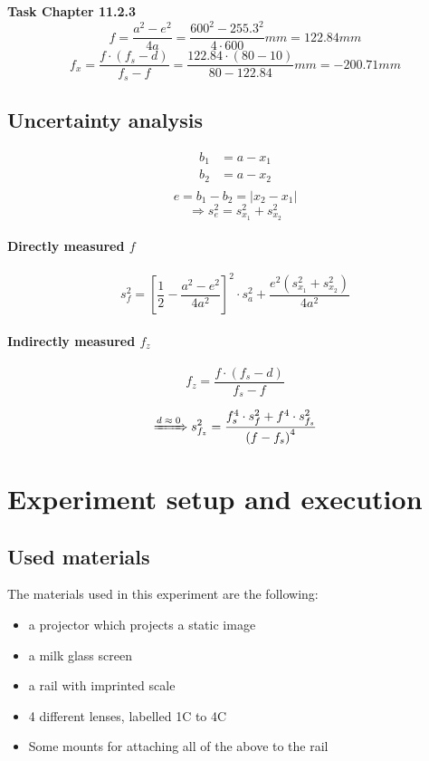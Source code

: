 \documentclass{scrreprt}
\begin{document}
\textbf{Task Chapter 11.2.3}
\begin{equation}
f = \frac{a^2-e^2}{4a} = \frac{600^2-255.3^2}{4\cdot 600}mm = 122.84mm
\end{equation}
\begin{equation}
f_x = \frac{f \cdot (f_s-d)}{f_s-f} = \frac{122.84\cdot (80-10)}{80-122.84}mm = -200.71mm
\end{equation}

\subsection{Uncertainty analysis}

\begin{align*}
b_1 &= a - x_1\\
b_2 &= a - x_2\\
\end{align*}
\[e = b_1 - b_2 = \lvert x_2 - x_1 \rvert\]
\begin{equation}
\Longrightarrow s_e^2 = s_{x_1}^2 + s_{x_2}^2
\end{equation}

\paragraph*{Directly measured $f$}

\begin{equation}
s_f^2 = \left[ \frac{1}{2} - \frac{a^2-e^2}{4 a^2} \right]^2 \cdot s_a^2 + \frac{e^2 \left( s_{x_1}^2 + s_{x_2}^2 \right)}{4  a^2}
\end{equation}

\paragraph*{Indirectly measured $f_z$}

\[f_z = \frac{f \cdot \left( f_s - d\right)}{f_s - f}\]


\begin{equation}
\xRightarrow{d \; \approx \; 0} s_{f_z}^2 = \frac{f_s^4\cdot s_f^2 + f^4 \cdot s_{f_s}^2}{\left( f-f_s \right)^4}
\end{equation}

\section{Experiment setup and execution}

\subsection{Used materials}
The materials used in this experiment are the following:
\begin{itemize}
\item a projector which projects a static image
\item a milk glass screen
\item a rail with imprinted scale
\item 4 different lenses, labelled 1C to 4C
\item Some mounts for attaching all of the above to the rail
\end{itemize}
\end{document}
